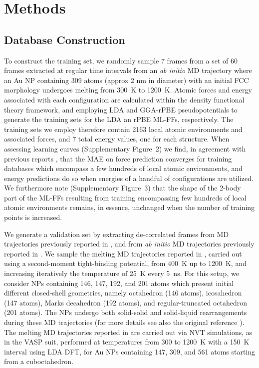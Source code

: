 \documentclass[%
aip,
 amsmath,amssymb,
 reprint,
]{revtex4-1}
\begin{document}
\section*{Methods}
%
\label{sec:method}
%
\subsection*{Database Construction}
\label{subsec:database}
%
To construct the  training set, we randomly sample 7 frames from a set of 60 frames extracted at regular time intervals from an \textit{ab initio} MD trajectory where an Au NP containing 309 atoms (approx 2 nm in diameter) with an initial FCC morphology undergoes melting from 300~K to 1200~K.
%
Atomic forces and energy associated with each configuration are calculated within the density functional theory framework, and employing LDA and GGA-rPBE pseudopotentials to generate the training sets for the LDA an rPBE ML-FFs, respectively.
% 
The training sets we employ therefore contain 2163 local atomic environments and associated forces, and 7 total energy values, one for each structure. 
%
When assessing learning curves (Supplementary Figure~2) we find, in agreement with previous reports \cite{Glielmo2018, Zeni2018}, that the MAE on force prediction converges for training databases which encompass a few hundreds of local atomic environments, and energy predictions do so when energies of a handful of configurations are utilized.
%
We furthermore note (Supplementary Figure~3) that the shape of the 2-body part of the ML-FFs resulting from training encompassing few hundreds of local atomic environments remains, in essence, unchanged when the number of training points is increased.
%

We generate a validation set by extracting de-correlated frames from MD trajectories previously reported in \citet{Delgado-Callico2020}, and from \textit{ab initio} MD trajectories previously reported in \citet{Foster2019}.
%
We sample the melting MD trajectories reported in \citet{Delgado-Callico2020}, carried out using a second-moment tight-binding potential, from 400~K up to 1200~K, and increasing iteratively the temperature of 25~K every 5~ns.
%
For this setup, we consider NPs containing 146, 147, 192, and 201 atoms which present initial different closed-shell geometries, namely octahedron (146 atoms), icosahedron (147 atoms), Marks decahedron (192 atoms), and regular-truncated octahedron (201 atoms).
%
The NPs undergo both solid-solid and solid-liquid rearrangements during these MD trajectories (for more details see also the original reference \cite{Delgado-Callico2020}).
%
The melting MD trajectories reported in \citet{Foster2019} are carried out via NVT simulations, as in the VASP suit, performed at temperatures from 300 to 1200~K with a 150~K interval using LDA DFT, for Au NPs containing 147, 309, and 561 atoms starting from a cuboctahedron.
\end{document}
